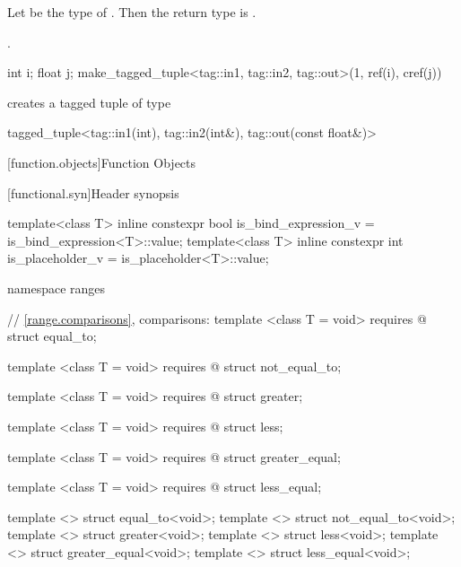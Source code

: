 {\begin{itemdescr}
\pnum
Let  be the type of .
Then the return type is .

\pnum
\returns {}.

\pnum
\enterexample

\begin{codeblock}
int i; float j;
make_tagged_tuple<tag::in1, tag::in2, tag::out>(1, ref(i), cref(j))
\end{codeblock}

creates a tagged tuple of type

\begin{codeblock}
tagged_tuple<tag::in1(int), tag::in2(int&), tag::out(const float&)>
\end{codeblock}
\exitexample
\end{itemdescr}
} %

\setcounter{section}{13}
[function.objects]{Function Objects}

[functional.syn]{Header  synopsis}

\begin{codeblock}
  [...]

  template<class T>
    inline constexpr bool is_bind_expression_v = is_bind_expression<T>::value;
  template<class T>
    inline constexpr int is_placeholder_v = is_placeholder<T>::value;
\end{codeblock}
\begin{addedblock}
\begin{codeblock}

  namespace ranges {
    // \ref{range.comparisons}, comparisons:
    template <class T = void>
      requires @\seebelow@
    struct equal_to;

    template <class T = void>
      requires @\seebelow@
    struct not_equal_to;

    template <class T = void>
      requires @\seebelow@
    struct greater;

    template <class T = void>
      requires @\seebelow@
    struct less;

    template <class T = void>
      requires @\seebelow@
    struct greater_equal;

    template <class T = void>
      requires @\seebelow@
    struct less_equal;

    template <> struct equal_to<void>;
    template <> struct not_equal_to<void>;
    template <> struct greater<void>;
    template <> struct less<void>;
    template <> struct greater_equal<void>;
    template <> struct less_equal<void>;
  }
\end{codeblock}
\end{addedblock}
\begin{codeblock}
}
\end{codeblock}

